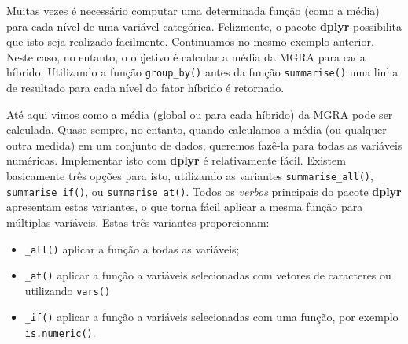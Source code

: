 \documentclass[
]{book}
\newenvironment{Shaded}{\begin{snugshade}}{\end{snugshade}}
\newcommand{\CommentTok}[1]{\textcolor[rgb]{0.56,0.35,0.01}{\textit{#1}}}
\newcommand{\DataTypeTok}[1]{\textcolor[rgb]{0.13,0.29,0.53}{#1}}
\newcommand{\KeywordTok}[1]{\textcolor[rgb]{0.13,0.29,0.53}{\textbf{#1}}}
\newcommand{\NormalTok}[1]{#1}
\newcommand{\OperatorTok}[1]{\textcolor[rgb]{0.81,0.36,0.00}{\textbf{#1}}}
\newcommand{\StringTok}[1]{\textcolor[rgb]{0.31,0.60,0.02}{#1}}
\providecommand{\tightlist}{%
  \setlength{\itemsep}{0pt}\setlength{\parskip}{0pt}}
\begin{document}
Muitas vezes é necessário computar uma determinada função (como a média) para cada nível de uma variável categórica. Felizmente, o pacote \textbf{dplyr} possibilita que isto seja realizado facilmente. Continuamos no mesmo exemplo anterior. Neste caso, no entanto, o objetivo é calcular a média da MGRA para cada híbrido. Utilizando a função \texttt{group\_by()}  antes da função \texttt{summarise()}  uma linha de resultado para cada nível do fator híbrido é retornado.

\begin{Shaded}
\end{Shaded}

Até aqui vimos como a média (global ou para cada híbrido) da MGRA pode ser calculada. Quase sempre, no entanto, quando calculamos a média (ou qualquer outra medida) em um conjunto de dados, queremos fazê-la para todas as variáveis numéricas. Implementar isto com \textbf{dplyr} é relativamente fácil. Existem basicamente três opções para isto, utilizando as variantes \texttt{summarise\_all()}, \texttt{summarise\_if()}, ou \texttt{summarise\_at()}. Todos os \emph{verbos} principais do pacote \textbf{dplyr} apresentam estas variantes, o que torna fácil aplicar a mesma função para múltiplas variáveis. Estas três variantes proporcionam: 

\begin{itemize}
\tightlist
\item
  \texttt{\_all()} aplicar a função a todas as variáveis;
\item
  \texttt{\_at()} aplicar a função a variáveis selecionadas com vetores de caracteres ou utilizando \texttt{vars()}
\item
  \texttt{\_if()} aplicar a função a variáveis selecionadas com uma função, por exemplo \texttt{is.numeric()}.
\end{itemize}
\end{document}
